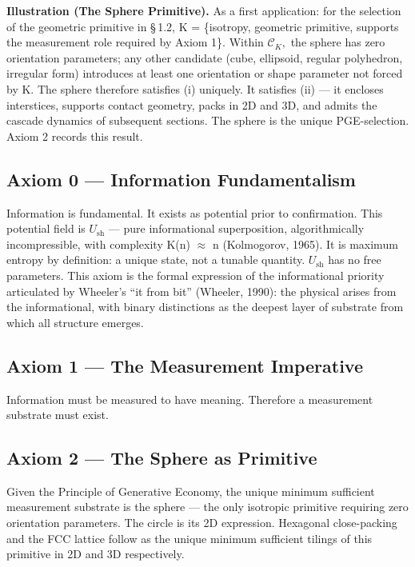 \documentclass[11pt,oneside]{report}
\theoremstyle{definition}
\theoremstyle{remark}
\begin{document}
\textbf{Illustration (The Sphere Primitive).} As a first application:
for the selection of the geometric primitive in \S\,1.2, K = \{isotropy,
geometric primitive, supports the measurement role required by Axiom
1\}. Within \ensuremath{\mathcal{C}_{K},} the sphere has zero orientation parameters; any other
candidate (cube, ellipsoid, regular polyhedron, irregular form)
introduces at least one orientation or shape parameter not forced by K.
The sphere therefore satisfies (i) uniquely. It satisfies (ii) --- it
encloses interstices, supports contact geometry, packs in 2D and 3D, and
admits the cascade dynamics of subsequent sections. The sphere is the
unique PGE-selection. Axiom 2 records this result.

\subsection*{Axiom 0 --- Information Fundamentalism}

Information is fundamental. It exists as potential prior to
confirmation. This potential field is \ensuremath{U_{\mathrm{sh}}} --- pure informational
superposition, algorithmically incompressible, with complexity K(n) \ensuremath{\approx} n
(Kolmogorov, 1965). It is maximum entropy by definition: a unique state,
not a tunable quantity. \ensuremath{U_{\mathrm{sh}}} has no free parameters. This axiom is the
formal expression of the informational priority articulated by Wheeler's
``it from bit'' (Wheeler, 1990): the physical arises from the
informational, with binary distinctions as the deepest layer of
substrate from which all structure emerges.

\subsection*{Axiom 1 --- The Measurement Imperative}

Information must be measured to have meaning. Therefore a measurement
substrate must exist.

\subsection*{Axiom 2 --- The Sphere as Primitive}

Given the Principle of Generative Economy, the unique minimum sufficient
measurement substrate is the sphere --- the only isotropic primitive
requiring zero orientation parameters. The circle is its 2D expression.
Hexagonal close-packing and the FCC lattice follow as the unique minimum
sufficient tilings of this primitive in 2D and 3D respectively.
\end{document}

